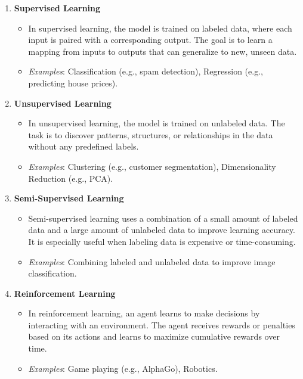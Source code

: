\documentclass{article}
\begin{document}
\begin{enumerate}
    \item \textbf{Supervised Learning}
    \begin{itemize}
        \item In supervised learning, the model is trained on labeled data, where each input is paired with a corresponding output. The goal is to learn a mapping from inputs to outputs that can generalize to new, unseen data.
        \item \textit{Examples}: Classification (e.g., spam detection), Regression (e.g., predicting house prices).
    \end{itemize}

    \item \textbf{Unsupervised Learning}
    \begin{itemize}
        \item In unsupervised learning, the model is trained on unlabeled data. The task is to discover patterns, structures, or relationships in the data without any predefined labels.
        \item \textit{Examples}: Clustering (e.g., customer segmentation), Dimensionality Reduction (e.g., PCA).
    \end{itemize}

    \item \textbf{Semi-Supervised Learning}
    \begin{itemize}
        \item Semi-supervised learning uses a combination of a small amount of labeled data and a large amount of unlabeled data to improve learning accuracy. It is especially useful when labeling data is expensive or time-consuming.
        \item \textit{Examples}: Combining labeled and unlabeled data to improve image classification.
    \end{itemize}

    \item \textbf{Reinforcement Learning}
    \begin{itemize}
        \item In reinforcement learning, an agent learns to make decisions by interacting with an environment. The agent receives rewards or penalties based on its actions and learns to maximize cumulative rewards over time.
        \item \textit{Examples}: Game playing (e.g., AlphaGo), Robotics.
    \end{itemize}


\end{enumerate}
\end{document}
